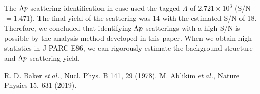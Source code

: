 \documentclass[a4paper,11pt,twoside,twocolumn]{article}
\begin{document}
The $\Lambda p$ scattering identification in case  used the tagged $\Lambda$ of $2.721\times10^{3}$ (S/N $=1.471$). The final yield of the scattering was 14 with the estimated S/N of 18. Therefore, we concluded that identifying $\Lambda p$ scatterings with a high S/N is possible by the analysis method developed in this paper. When we obtain high statistics in J-PARC E86, we can rigorously estimate the background structure and $\Lambda p$ scattering yield. 



{\scriptsize{
\begin{thebibliography}{9}
R. D. Baker $et\ al.$, Nucl. Phys. B 141, 29 (1978).
M. Ablikim $et\ al.$, Nature Physics 15, 631 (2019).
\end{thebibliography}
}}
\end{document}
